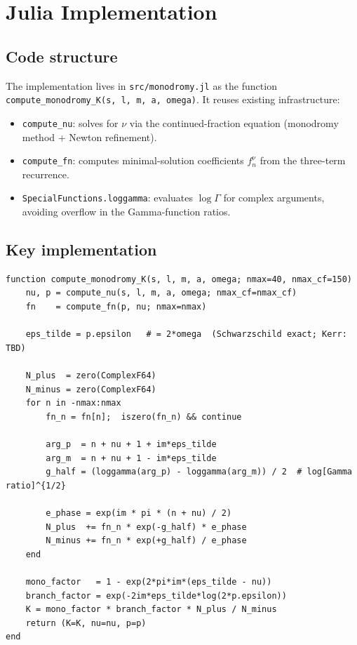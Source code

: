 \documentclass[12pt,a4paper]{article}
\begin{document}
\section{Julia Implementation}

\subsection{Code structure}

The implementation lives in \texttt{src/monodromy.jl} as the function
\texttt{compute\_monodromy\_K(s, l, m, a, omega)}.
It reuses existing infrastructure:
\begin{itemize}
  \item \texttt{compute\_nu}: solves for $\nu$ via the continued-fraction
        equation (monodromy method + Newton refinement).
  \item \texttt{compute\_fn}: computes minimal-solution coefficients $f_n^\nu$
        from the three-term recurrence.
  \item \texttt{SpecialFunctions.loggamma}: evaluates $\log\Gamma$ for complex arguments,
        avoiding overflow in the Gamma-function ratios.
\end{itemize}

\subsection{Key implementation}

\begin{lstlisting}
function compute_monodromy_K(s, l, m, a, omega; nmax=40, nmax_cf=150)
    nu, p = compute_nu(s, l, m, a, omega; nmax_cf=nmax_cf)
    fn    = compute_fn(p, nu; nmax=nmax)

    eps_tilde = p.epsilon   # = 2*omega  (Schwarzschild exact; Kerr: TBD)

    N_plus  = zero(ComplexF64)
    N_minus = zero(ComplexF64)
    for n in -nmax:nmax
        fn_n = fn[n];  iszero(fn_n) && continue

        arg_p  = n + nu + 1 + im*eps_tilde
        arg_m  = n + nu + 1 - im*eps_tilde
        g_half = (loggamma(arg_p) - loggamma(arg_m)) / 2  # log[Gamma ratio]^{1/2}

        e_phase = exp(im * pi * (n + nu) / 2)
        N_plus  += fn_n * exp(-g_half) * e_phase
        N_minus += fn_n * exp(+g_half) / e_phase
    end

    mono_factor   = 1 - exp(2*pi*im*(eps_tilde - nu))
    branch_factor = exp(-2im*eps_tilde*log(2*p.epsilon))
    K = mono_factor * branch_factor * N_plus / N_minus
    return (K=K, nu=nu, p=p)
end
\end{lstlisting}
\end{document}

